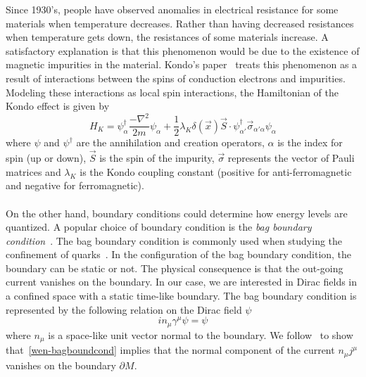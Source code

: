 Since 1930's, people have observed anomalies in electrical resistance for some materials when temperature decreases. 
Rather than having decreased resistances when temperature gets down,
the resistances of some materials increase. 
A satisfactory explanation is that this phenomenon would be due to the existence of magnetic impurities in the material. 
Kondo's paper~\cite{Kondo1964} treats this phenomenon as a result of interactions between the spins of conduction electrons and impurities.
Modeling these interactions as local spin interactions,
the Hamiltonian of the Kondo effect is given by~\cite{Erdmenger2013}
\begin{equation}\label{vacuum-kondohamiltonian}
H_K = \psi_\alpha^\dagger \frac{-\nabla^2}{2m}\psi_\alpha +
\frac 1 2\lambda_K \delta(\vec{x})\vec{S}\cdot \psi_{\alpha'}^\dagger  \vec{\sigma}_{\alpha' \alpha} \psi_\alpha
\end{equation}
where $\psi$ and $\psi^\dagger$ are the annihilation and creation operators, 
$\alpha$ is the index for spin (up or down), 
$\vec{S}$ is the spin of the impurity,
$\vec{\sigma}$ represents the vector of Pauli matrices and $\lambda_K$ is the Kondo coupling constant (positive for anti-ferromagnetic and negative for ferromagnetic).
\\\\
%
On the other hand, boundary conditions could determine how energy levels are quantized.
A popular choice of boundary condition is the \textit{bag boundary condition}~\cite{Chodos1974}.
The bag boundary condition is commonly used when studying the confinement of quarks~\cite{Hasenfratz1978}.
In the configuration of the bag boundary condition, the boundary can be static or not. 
The physical consequence is that the out-going current vanishes on the boundary.
In our case, we are interested in Dirac fields in a confined space with a static time-like boundary.
The bag boundary condition is represented by the following relation on the Dirac field $\psi$ 
\begin{equation}\label{wen-bagboundcond}
i n_\mu\gamma^\mu \psi = \psi
\end{equation}
where $n_\mu$ is a space-like unit vector normal to the boundary.
We follow~\cite{Stokes2015} to show that~\cref{wen-bagboundcond} implies that the normal component of the current $n_\mu j^\mu$ vanishes on the boundary $\partial M$.
